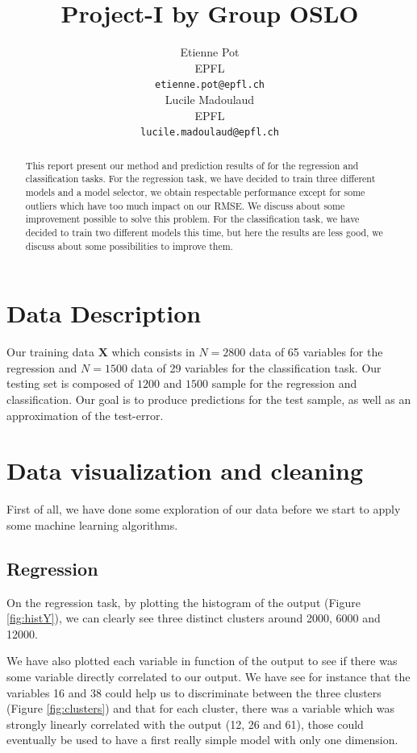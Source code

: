 \documentclass{article} %
\title{Project-I by Group OSLO}
\author{
Etienne Pot\\
EPFL \\
\texttt{etienne.pot@epfl.ch} \\ \And 
Lucile Madoulaud\\
EPFL \\
\texttt{lucile.madoulaud@epfl.ch} \\
}
\begin{document}
\maketitle

\begin{abstract}
This report present our method and prediction results of for the regression and classification tasks. For the regression task, we have decided to train three different models and a model selector, we obtain respectable performance except for some outliers which have too much impact on our RMSE. We discuss about some improvement possible to solve this problem.\newline
For the classification task, we have decided to train two different models this time, but here the results are less good, we discuss about some possibilities to improve them.
\end{abstract}

\section{Data Description}
Our training data $\mathbf{X}$ which consists in $N=2800$ data of 65 variables for the regression and $N=1500$ data of 29 variables for the classification task. Our testing set is composed of $1200$ and $1500$ sample for the regression and classification.
\newline
Our goal is to produce predictions for the test sample, as well as an approximation of the test-error.

\section{Data visualization and cleaning}
First of all, we have done some exploration of our data before we start to apply some machine learning algorithms.

\subsection{Regression}

On the regression task, by plotting the histogram of the output (Figure \ref{fig:histY}), we can clearly see three distinct clusters around 2000, 6000 and 12000.

We have also plotted each variable in function of the output to see if there was some variable directly correlated to our output. We have see for instance that the variables 16 and 38 could help us to discriminate between the three clusters (Figure \ref{fig:clusters}) and that for each cluster, there was a variable which was strongly linearly correlated with the output (12, 26 and 61), those could eventually be used to have a first really simple model with only one dimension.
\end{document}
